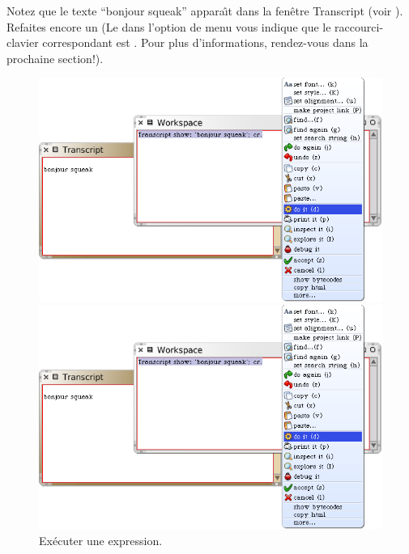 \documentclass[a4paper,10pt,twoside]{book}
\begin{document}
Notez que le texte ``bonjour squeak'' appara\^{\i}t dans la
fen\^etre Transcript (voir ).
Refaites encore un 
(Le  dans l'option de menu  vous indique que
le raccourci-clavier correspondant est . Pour plus
d'informations, rendez-vous dans la prochaine section!).

\begin{figure}[htb]
\ifluluelse
	{\centerline {\includegraphics[width=\textwidth]{Doit}}}
	{\centerline {\includegraphics[scale=0.7]{Doit}}}
\caption{Ex\'ecuter une expression.\label{fig:doit}}
\end{figure}
\end{document}
